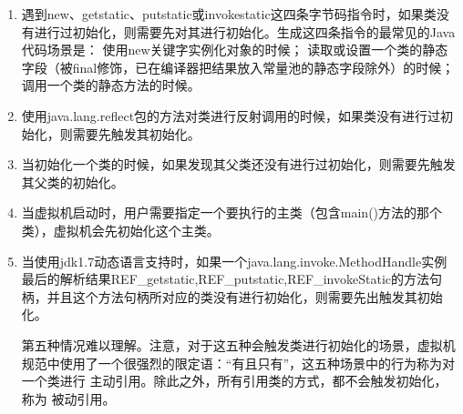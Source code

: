 \documentclass[../../../interview-questions.tex]{subfiles}
\begin{document}
\begin{enumerate}

\item{遇到new、getstatic、putstatic或invokestatic这四条字节码指令时，如果类没有进行过初始化，则需要先对其进行初始化。生成这四条指令的最常见的Java代码场景是：}
使用new关键字实例化对象的时候；
读取或设置一个类的静态字段（被final修饰，已在编译器把结果放入常量池的静态字段除外）的时候；
调用一个类的静态方法的时候。
\item{使用java.lang.reflect包的方法对类进行反射调用的时候，如果类没有进行过初始化，则需要先触发其初始化。}

\item{当初始化一个类的时候，如果发现其父类还没有进行过初始化，则需要先触发其父类的初始化。}

\item{当虚拟机启动时，用户需要指定一个要执行的主类（包含main()方法的那个类），虚拟机会先初始化这个主类。}

\item{当使用jdk1.7动态语言支持时，如果一个java.lang.invoke.MethodHandle实例最后的解析结果REF\_getstatic,REF\_putstatic,REF\_invokeStatic的方法句柄，并且这个方法句柄所对应的类没有进行初始化，则需要先出触发其初始化。}

第五种情况难以理解。注意，对于这五种会触发类进行初始化的场景，虚拟机规范中使用了一个很强烈的限定语：“有且只有”，这五种场景中的行为称为对一个类进行 主动引用。除此之外，所有引用类的方式，都不会触发初始化，称为 被动引用。

\end{enumerate}
\end{document}
